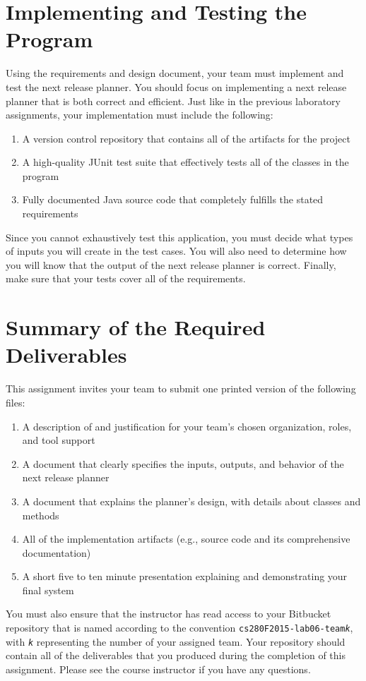 \section*{Implementing and Testing the Program}

Using the requirements and design document, your team must implement and test the next release planner. You should focus on
implementing a next release planner that is both correct and efficient. Just like in the previous laboratory assignments,
your implementation must include the following:

\vspace*{-.1in}
\begin{enumerate}
\itemsep0em
    \item A version control repository that contains all of the artifacts for the project
    \item A high-quality JUnit test suite that effectively tests all of the classes in the program
    \item Fully documented Java source code that completely fulfills the stated requirements
\end{enumerate}
\vspace*{-.1in}

Since you cannot exhaustively test this application, you must decide what types of inputs you will create in the test
cases.  You will also need to determine how you will know that the output of the next release planner is correct.
Finally, make sure that your tests cover all of the requirements.

\section*{Summary of the Required Deliverables}

This assignment invites your team to submit one printed version of the following files:
\vspace*{-.1in}
\begin{enumerate}
    \itemsep0em
    \item A description of and justification for your team's chosen organization, roles, and tool support
    \item A document that clearly specifies the inputs, outputs, and behavior of the next release planner
    \item A document that explains the planner's design, with details about classes and methods
    \item All of the implementation artifacts (e.g., source code and its comprehensive documentation)
    \item A short five to ten minute presentation explaining and demonstrating your final system
\end{enumerate}
\vspace*{-.1in}

You must also ensure that the instructor has read access to your Bitbucket repository that is named according to the
convention {\tt cs280F2015-lab06-team{\em k}}, with {\tt {\em k}} representing the number of your assigned team.  Your
repository should contain all of the deliverables that you produced during the completion of this assignment.  Please
see the course instructor if you have any questions.


